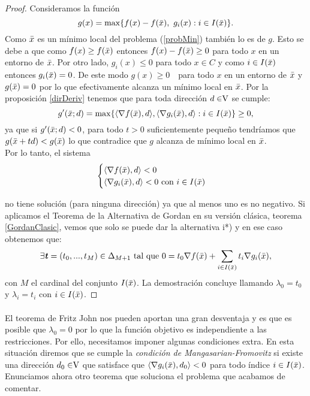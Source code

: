 		\begin{proof}
			Consideramos la función 
			\[
			g(x) = \max \{ f(x) - f(\bar{x}),\text{ } g_i(x) : i \in I(\bar{x})\}.
			\]
			Como $ \bar{x} $ es un mínimo local del problema (\ref{probMin}) también lo es de $ g $. Esto se debe a que como $ f(x) \geq f(\bar{x}) $ entonces $ f(x) - f(\bar{x}) \geq 0$ para todo $ x $ en un entorno de $ \bar{x} $. Por otro lado, $ g_i(x) \leq 0 $ para todo $ x \in C $ y como $ i \in I(\bar{x}) $ entonces $ g_i(\bar{x})=0 $. De este modo $ g(x) \geq 0 \text{ } $ para todo $ x $ en un entorno de $ \bar{x} $ y $ g(\bar{x}) = 0 $ por lo que efectivamente alcanza un mínimo local en $ \bar{x} $. Por la proposición \ref{dirDeriv} tenemos que para toda dirección $ d \in \vecSpace $ se cumple:
			\[
			g'(\bar{x};d) = \max \{ \langle \nabla f(\bar{x}), d\rangle , \langle \nabla g_i(\bar{x}),d \rangle : i \in I(\bar{x})\} \geq 0,
			\]
			ya que si $ g'(\bar{x};d) < 0 $, para todo $ t > 0 $ suficientemente pequeño tendríamos que $ g(\bar{x} + td) < g(\bar{x}) $ lo que contradice que $ g $ alcanza de mínimo local en $ \bar{x} $. \\
			
			Por lo tanto, el sistema 
			\begin{equation*}
			\begin{cases}
			\langle \nabla f(\bar{x}), d\rangle  < 0 \\
			\langle \nabla g_i(\bar{x}),d \rangle < 0\text{ con } i \in I(\bar{x})
			\end{cases}
			\end{equation*}
			
			no tiene solución (para ninguna dirección) ya que al menos uno es no negativo. Si aplicamos el Teorema de la Alternativa de Gordan en su versión clásica, teorema \ref{GordanClasic}, vemos que solo se puede dar la alternativa i*) y en ese caso obtenemos que:
			\[
			 \exists \textbf{\emph{t}} = (t_0, ..., t_{M})\in \Delta_{M+1}  \text{ tal que }0 = t_0 \nabla f(\bar{x}) + \sum_{i \in I(\bar{x})}  t_i \nabla g_i (\bar{x}),
			 \]
			con $ M $ el cardinal del conjunto $ I(\bar{x}) $. La demostración concluye llamando $ \lambda_0 = t_0 $ y $ \lambda_i = t_i $ con $ i \in I(\bar{x}) $.
		\end{proof}
	
		\paragraph{}El teorema de Fritz John nos pueden aportan una gran desventaja y es que es posible que $ \lambda_0 = 0 $ por lo que la función objetivo es independiente a las restricciones. Por ello, necesitamos imponer algunas condiciones extra. En esta situación diremos que se cumple la \textit{condición de Mangasarian-Fromovitz} si existe una dirección $ d_0 \in \vecSpace $ que satisface que $ \langle \nabla g_i(\bar{x}),d_0 \rangle < 0 $ para todo índice $ i \in I(\bar{x})$. Enunciamos ahora otro teorema que soluciona el problema que acabamos de comentar.
		
